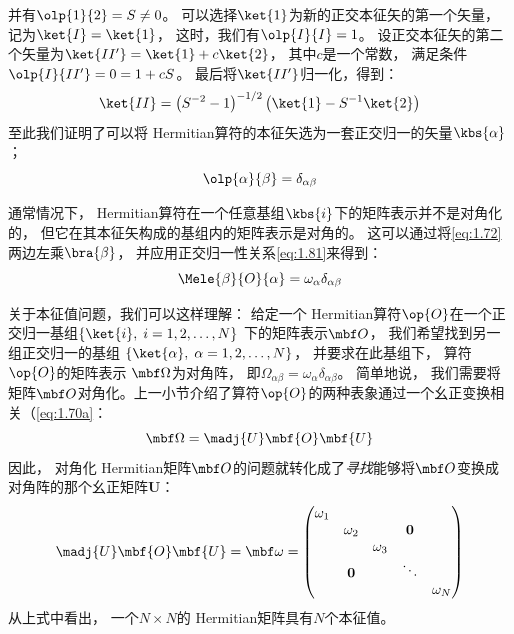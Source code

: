 \begin{enumerate}[]
 并有$\olp{1}{2} = S \neq 0$。
 可以选择$\ket{1}$为新的正交本征矢的第一个矢量，
 记为$\ket{I} = \ket{1}$，
 这时，我们有$\olp{I}{I} = 1$。
 设正交本征矢的第二个矢量为$\ket{II^\prime} = \ket{1} + c\ket{2}$，
 其中$c$是一个常数，
 满足条件$\olp{I}{II^\prime} = 0 = 1+cS$。
 最后将$\ket{II^\prime}$归一化，得到：
 \begin{equation}
     \ket{II} = \left(S^{-2}-1\right)^{-1/2}\left(\ket{1}-S^{-1}\ket{2}\right)
     \label{eq:1.80}
 \end{equation}
 至此我们证明了可以将 Hermitian算符的本征矢选为一套正交归一的矢量$\kbs{\alpha}$；
 \begin{equation}
     \olp{\alpha}{\beta} = \delta_{\alpha\beta}
     \label{eq:1.81}
 \end{equation}
\end{enumerate}

通常情况下，
Hermitian算符在一个任意基组$\kbs{i}$下的矩阵表示并不是对角化的，
但它在其本征矢构成的基组内的矩阵表示是对角的。
这可以通过将\autoref{eq:1.72}两边左乘$\bra{\beta}$，
并应用正交归一性关系\autoref{eq:1.81}来得到：
\begin{equation}
 \Mele{\beta}{O}{\alpha} = \omega_\alpha\delta_{\alpha\beta}
 \label{eq:1.82}
\end{equation}

关于本征值问题，我们可以这样理解：
给定一个 Hermitian算符$\op{O}$在一个正交归一基组$\left\{\ket{i},\; i = 1, 2, \dots, N\right\}$ 下的矩阵表示$\mbf O$，
我们希望找到另一组正交归一的基组 $\left\{\ket{\alpha},\; \alpha = 1, 2, \dots, N\right\}$，
并要求在此基组下，
算符$\op{O}$的矩阵表示 $\mbf\Omega$为对角阵，
即$\Omega_{\alpha\beta} = \omega_\alpha\delta_{\alpha\beta}$。
简单地说，
我们需要将矩阵$\mbf O$对角化。上一小节介绍了算符$\op{O}$的两种表象通过一个幺正变换相关（\autoref{eq:1.70a}：
\[\mbf\Omega = \madj{U}\mbf{O}\mbf{U}\]
因此，
对角化 Hermitian矩阵$\mbf O$的问题就转化成了\emph{寻找}能够将$\mbf O$变换成对角阵的那个幺正矩阵$\mathbf{U}$：
\begin{equation}
 \madj{U}\mbf{O}\mbf{U} = \mbf\omega = \begin{pmatrix}
     \omega_1     & & & &\\
          &\omega_2 &     &\mathbf{0} &\\
          & &\omega_3 & &\\
          &\mathbf{0} & & \ddots & \\
          & &     & &\omega_N
 \end{pmatrix}
 \label{eq:1.83}
\end{equation}
从上式中看出，
一个$N\times N$的 Hermitian矩阵具有$N$个本征值。

